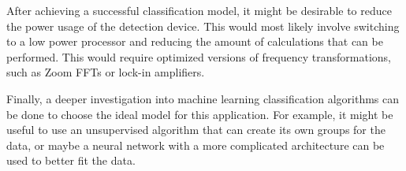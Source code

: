 After achieving a successful classification model, it might be desirable to reduce the power usage of the detection device.  This would most likely involve switching to a low power processor and reducing the amount of calculations that can be performed.  This would require optimized versions of frequency transformations, such as Zoom FFTs or lock-in amplifiers.

Finally, a deeper investigation into machine learning classification algorithms can be done to choose the ideal model for this application.  For example, it might be useful to use an unsupervised algorithm that can create its own groups for the data, or maybe a neural network with a more complicated architecture can be used to better fit the data.








